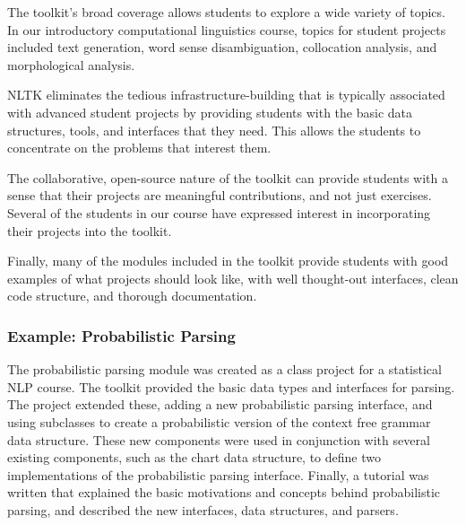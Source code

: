 \documentclass[11pt]{article}
\begin{document}
The toolkit's broad coverage allows students to explore a wide variety
of topics.  In our introductory computational linguistics course,
topics for student projects included text generation, word sense
disambiguation, collocation analysis, and morphological analysis.

NLTK eliminates the tedious infrastructure-building that is typically
associated with advanced student projects by providing students with
the basic data structures, tools, and interfaces that they need.  This
allows the students to concentrate on the problems that interest them.

The collaborative, open-source nature of the toolkit can provide
students with a sense that their projects are meaningful
contributions, and not just exercises.  Several of the students in our
course have expressed interest in incorporating their projects into
the toolkit.

Finally, many of the modules included in the toolkit provide students
with good examples of what projects should look like, with well
thought-out interfaces, clean code structure, and thorough
documentation.

\subsubsection*{Example: Probabilistic Parsing}

The probabilistic parsing module was created as a class project for a
statistical NLP course.  The toolkit provided the basic data types and
interfaces for parsing.  The project extended these, adding a new
probabilistic parsing interface, and using subclasses to create a
probabilistic version of the context free grammar data structure.
These new components were used in conjunction with several existing
components, such as the chart data structure, to define two
implementations of the probabilistic parsing interface.  Finally, a
tutorial was written that explained the basic motivations and concepts
behind probabilistic parsing, and described the new interfaces, data
structures, and parsers.
\end{document}
